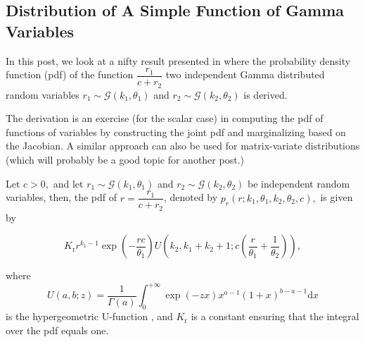 \subsection{Distribution of A Simple Function of Gamma Variables}

In this post, we look at a nifty result presented in \cite{Krishnamoorthy2019} where the probability density function (pdf) of the function $\dfrac{r_1}{c+r_2}$ two independent Gamma distributed random variables $r_1 \sim \mathcal{G}(k_1,\theta_1)$ and $r_2 \sim \mathcal{G}(k_2, \theta_2)$ is derived.

The derivation is an exercise (for the scalar case) in computing the pdf of functions of variables by constructing the joint pdf and marginalizing based on the Jacobian. A similar approach can also be used for matrix-variate distributions (which will probably be a good topic for another post.)

\begin{theorem}
Let $c > 0,$ and let $r_1 \sim \mathcal{G}(k_1,\theta_1)$ and $r_2 \sim \mathcal{G}(k_2, \theta_2)$ be independent random variables, then, the pdf of $r = \dfrac{r_1}{c+r_2}$, denoted by $p_r(r;k_1,\theta_1,k_2,\theta_2,c),$ is given by

\begin{equation}K_\mathrm{r} r^{k_1-1} \exp\left(-\frac{rc}{\theta_1}\right) U\left(k_2,k_1+k_2+1;c\left(\frac{r}{\theta_1}+\frac{1}{\theta_2}\right)\right),\end{equation}

where $$U(a,b;z) = \frac{1}{\Gamma(a)} \int_{0}^{+\infty} \exp(-zx) x^{a-1} (1+x)^{b-a-1} \mathrm{d}x$$ is the hypergeometric U-function \cite[Chapter 13, Kummer function]{Olver2010}, and $K_\mathrm{r}$ is a constant ensuring that the integral over the pdf equals one.
\end{theorem}

